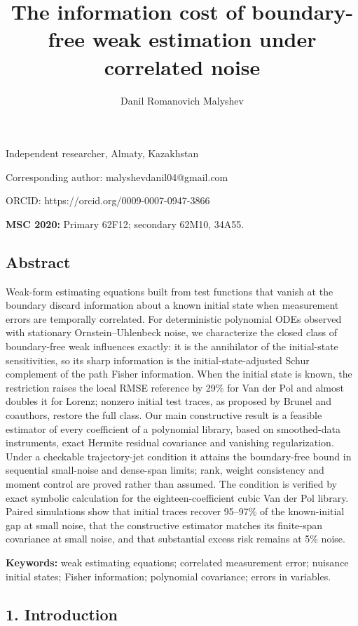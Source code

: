 \documentclass[
  american,
  11pt,
]{article}
\title{The information cost of boundary-free weak estimation under
correlated noise}
\author{Danil Romanovich Malyshev}
\date{}
\begin{document}
\maketitle

Independent researcher, Almaty, Kazakhstan

Corresponding author: malyshevdanil04@gmail.com

ORCID: https://orcid.org/0009-0007-0947-3866

\textbf{MSC 2020:} Primary 62F12; secondary 62M10, 34A55.

\subsection{Abstract}\label{abstract}

Weak-form estimating equations built from test functions that vanish at
the boundary discard information about a known initial state when
measurement errors are temporally correlated. For deterministic
polynomial ODEs observed with stationary Ornstein--Uhlenbeck noise, we
characterize the closed class of boundary-free weak influences exactly:
it is the annihilator of the initial-state sensitivities, so its sharp
information is the initial-state-adjusted Schur complement of the path
Fisher information. When the initial state is known, the restriction
raises the local RMSE reference by 29\% for Van der Pol and almost
doubles it for Lorenz; nonzero initial test traces, as proposed by
Brunel and coauthors, restore the full class. Our main constructive
result is a feasible estimator of every coefficient of a polynomial
library, based on smoothed-data instruments, exact Hermite residual
covariance and vanishing regularization. Under a checkable
trajectory-jet condition it attains the boundary-free bound in
sequential small-noise and dense-span limits; rank, weight consistency
and moment control are proved rather than assumed. The condition is
verified by exact symbolic calculation for the eighteen-coefficient
cubic Van der Pol library. Paired simulations show that initial traces
recover 95--97\% of the known-initial gap at small noise, that the
constructive estimator matches its finite-span covariance at small
noise, and that substantial excess risk remains at 5\% noise.

\textbf{Keywords:} weak estimating equations; correlated measurement
error; nuisance initial states; Fisher information; polynomial
covariance; errors in variables.

\subsection{1. Introduction}\label{introduction}
\end{document}
